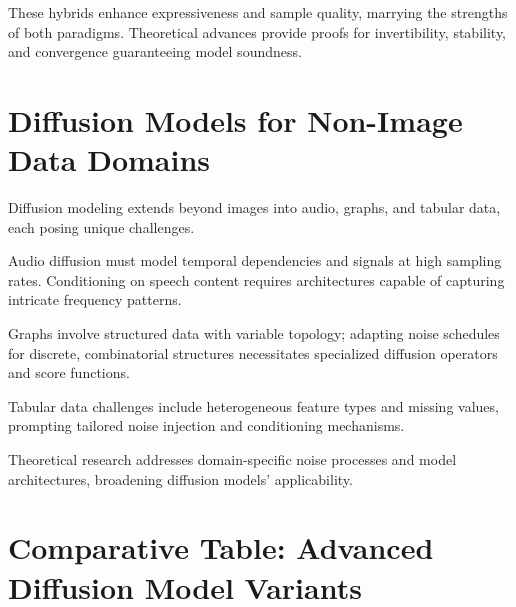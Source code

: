 These hybrids enhance expressiveness and sample quality, marrying the strengths of both paradigms. Theoretical advances provide proofs for invertibility, stability, and convergence guaranteeing model soundness.

\section{Diffusion Models for Non-Image Data Domains}

Diffusion modeling extends beyond images into audio, graphs, and tabular data, each posing unique challenges.

Audio diffusion must model temporal dependencies and signals at high sampling rates. Conditioning on speech content requires architectures capable of capturing intricate frequency patterns.

Graphs involve structured data with variable topology; adapting noise schedules for discrete, combinatorial structures necessitates specialized diffusion operators and score functions.

Tabular data challenges include heterogeneous feature types and missing values, prompting tailored noise injection and conditioning mechanisms.

Theoretical research addresses domain-specific noise processes and model architectures, broadening diffusion models' applicability.

\section{Comparative Table: Advanced Diffusion Model Variants}

\begin{table}[h]
\centering
{}
\caption{Comparative Overview of Advanced Diffusion Model Variants}
\end{table}

